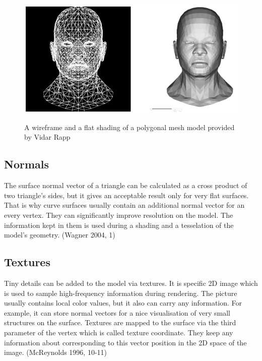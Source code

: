\documentclass[twoside, english, 11pt]{report}
\begin{document}
\begin{figure}[!h]
\includegraphics[scale=0.55]{img/mesh}\\
\caption{A wireframe and a flat shading of a polygonal mesh model provided by Vidar Rapp\label{fig:mesh}}
\end{figure}

\subsection{Normals}
The surface normal vector of a triangle can be calculated as a cross product of two triangle's sides, but it gives an acceptable result only for very flat surfaces. That is why curve surfaces usually contain an additional normal vector for an every vertex. They can significantly improve resolution on the model. The information kept in them is used during a shading and a tesselation of the model's geometry. (Wagner 2004, 1)\\


\subsection{Textures}
Tiny details can be added to the model via textures. It is specific 2D image which is used to sample high-frequency information during rendering. The picture usually contains local color values, but it also can carry any information. For example, it can store normal vectors for a nice visualisation of very small structures on the surface. Textures are mapped to the surface via the third parameter of the vertex which is called texture coordinate. They keep any information about corresponding to this vector position in the 2D space of the image. (McReynolds 1996, 10-11)\\
\end{document}
